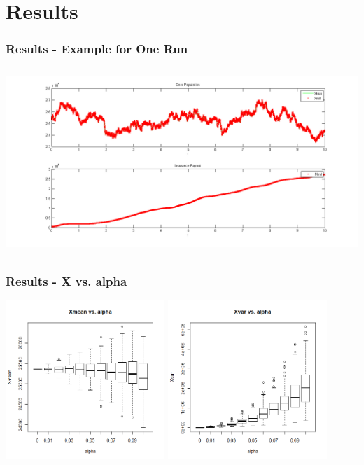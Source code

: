 



\section{Results}

\begin{frame}
    \frametitle{Results - Example for One Run}
\hspace*{-2cm}
\includegraphics[height=7cm]{deerins}
\end{frame}


\begin{frame}
    \frametitle{Results - X vs. alpha }
\hspace*{-5mm}
\includegraphics[height=6cm]{boxplot500_xmean_alpha}
\includegraphics[height=6cm]{boxplot500_xvar_alpha}
\end{frame}

